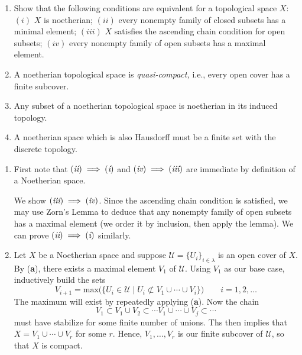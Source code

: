 \documentclass{hw_pset} %
\begin{document}
\begin{exercise}[1.7]
    \begin{enumerate}
        \item Show that the following conditions are equivalent for a topological
        space $X$: $(i)$ $X$ is noetherian; $(ii)$ every nonempty family of
        closed subsets has a minimal element; $(iii)$ $X$ satisfies the ascending
        chain condition for open subsets; $(iv)$ every nonempty family of open
        subsets has a maximal element.
      \item A noetherian topological space is \emph{quasi-compact,} i.e., every
        open cover has a finite subcover.
      \item Any subset of a noetherian topological space is noetherian in its
        induced topology.
      \item A noetherian space which is also Hausdorff must be a finite set with
        the discrete topology.    
    \end{enumerate}
\end{exercise}

\begin{solution}
    \begin{enumerate}
        \item First note that $(\emph{ii}) \implies (\emph{i})$ and $(\emph{iv}) \implies (\emph{iii})$ 
        are immediate by definition of a Noetherian space.
        
        We show $(\emph{iii}) \implies (\emph{iv})$. Since the ascending chain condition is satisfied, 
        we may use Zorn's Lemma to deduce that any nonempty family of open subsets has 
        a maximal element (we order it by inclusion, then apply the lemma).
        We can prove $(\emph{ii}) \implies (\emph{i})$ similarly.
    
        \item Let $X$ be a Noetherian space and suppose $\mathcal{U} = \{U_{i}\}_{i \in \lambda}$ 
        is an open cover of $X$. 
        By (\textbf{a}), there exists a maximal element $V_1$ of $\mathcal{U}$. Using 
        $V_1$ as our base case, inductively build the sets 
        \[
            V_{i+1} = \text{max}\bigg(\bigg\{ U_i \in \mathcal{U} \;\bigg|\; U_i \not\subset V_1 \cup \cdots \cup V_{i}  \bigg\}\bigg) \qquad i = 1, 2, \dots
        \]
        The maximum will exist by repeatedly applying (\textbf{a}). Now the chain 
        \[
            V_1 \subset V_1 \cup V_2 \subset \cdots V_1 \cup \cdots \cup V_j \subset \cdots
        \]
        must have stabilize for some finite number of unions. Ths then implies that 
        $X = V_1 \cup \cdots \cup V_r$ for some $r$. Hence, $V_1, \dots, V_r$ is our finite 
        subcover of $\mathcal{U}$, so that $X$ is compact.

    \end{enumerate}
\end{solution}
\end{document}
